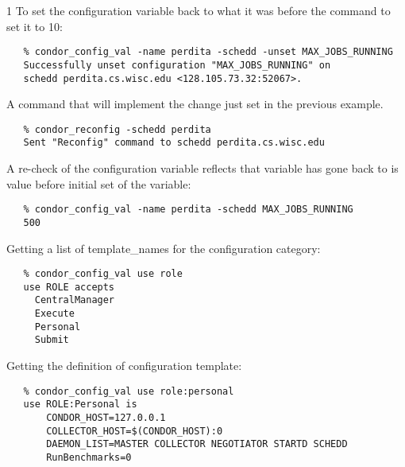 \begin{ManPage}{\label{man-condor-config-val}}{1}
To set the configuration variable 
back to what it was before the command to set it to 10:
\footnotesize
\begin{verbatim}
   % condor_config_val -name perdita -schedd -unset MAX_JOBS_RUNNING
   Successfully unset configuration "MAX_JOBS_RUNNING" on 
   schedd perdita.cs.wisc.edu <128.105.73.32:52067>.
\end{verbatim}
\normalsize

A command that will implement the change just set in the previous
example.
\footnotesize
\begin{verbatim}
   % condor_reconfig -schedd perdita
   Sent "Reconfig" command to schedd perdita.cs.wisc.edu
\end{verbatim}
\normalsize

A re-check of the configuration variable reflects that variable
has gone back to is value before initial set of the variable:
\footnotesize
\begin{verbatim}
   % condor_config_val -name perdita -schedd MAX_JOBS_RUNNING
   500
\end{verbatim}
\normalsize

Getting a list of template\_names for the  configuration category:
\footnotesize
\begin{verbatim}
   % condor_config_val use role
   use ROLE accepts
     CentralManager
     Execute
     Personal
     Submit
\end{verbatim}
\normalsize

Getting the definition of  configuration template:
\footnotesize
\begin{verbatim}
   % condor_config_val use role:personal
   use ROLE:Personal is
   	   CONDOR_HOST=127.0.0.1
	   COLLECTOR_HOST=$(CONDOR_HOST):0
	   DAEMON_LIST=MASTER COLLECTOR NEGOTIATOR STARTD SCHEDD
	   RunBenchmarks=0
\end{verbatim}
\normalsize

\end{ManPage}
